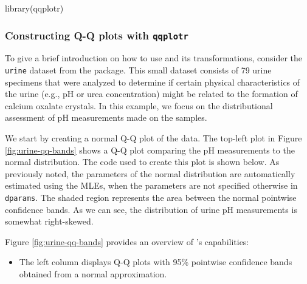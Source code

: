 \begin{Schunk}
\begin{Sinput}
library(qqplotr)
\end{Sinput}
\end{Schunk}

\subsubsection{\texorpdfstring{Constructing Q-Q plots with
\texttt{qqplotr}}{Constructing Q-Q plots with qqplotr}}\label{constructing-q-q-plots-with-qqplotr}

To give a brief introduction on how to use  and its
transformations, consider the \texttt{urine} dataset from the 
package. This small dataset consists of 79 urine specimens that were
analyzed to determine if certain physical characteristics of the urine
(e.g., pH or urea concentration) might be related to the formation of
calcium oxalate crystals. In this example, we focus on the
distributional assessment of pH measurements made on the samples.

We start by creating a normal Q-Q plot of the data. The top-left plot in
Figure \ref{fig:urine-qq-bands} shows a Q-Q plot comparing the pH
measurements to the normal distribution. The code used to create this
plot is shown below. As previously noted, the parameters of the normal
distribution are automatically estimated using the MLEs, when the
parameters are not specified otherwise in \texttt{dparams}. The shaded
region represents the area between the normal pointwise confidence
bands. As we can see, the distribution of urine pH measurements is
somewhat right-skewed.

\begin{Schunk}
\end{Schunk}

Figure \ref{fig:urine-qq-bands}  provides an overview of
's capabilities:

\begin{itemize}
\tightlist
\item
  The left column displays Q-Q plots with 95\% pointwise confidence
  bands obtained from a normal approximation.
\end{itemize}


